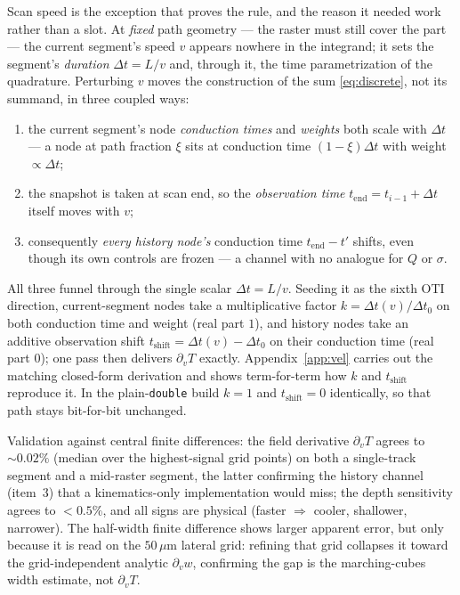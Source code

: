 \documentclass[11pt]{article}
\begin{document}
Scan speed is the exception that proves the rule, and the reason it needed
work rather than a slot. At \emph{fixed} path geometry --- the raster must
still cover the part --- the current segment's speed $v$ appears nowhere in
the integrand; it sets the segment's \emph{duration} $\Delta t = L/v$ and,
through it, the time parametrization of the quadrature. Perturbing $v$ moves
the construction of the sum \eqref{eq:discrete}, not its summand, in three
coupled ways:
\begin{enumerate}
  \item the current segment's node \emph{conduction times} and \emph{weights}
        both scale with $\Delta t$ --- a node at path fraction $\xi$ sits at
        conduction time $(1-\xi)\Delta t$ with weight $\propto \Delta t$;
  \item the snapshot is taken at scan end, so the \emph{observation time}
        $t_{\mathrm{end}} = t_{i-1} + \Delta t$ itself moves with $v$;
  \item consequently \emph{every history node's} conduction time
        $t_{\mathrm{end}} - t'$ shifts, even though its own controls are frozen
        --- a channel with no analogue for $Q$ or $\sigma$.
\end{enumerate}
All three funnel through the single scalar $\Delta t = L/v$. Seeding it as the
sixth OTI direction, current-segment nodes take a multiplicative factor
$k = \Delta t(v)/\Delta t_0$ on both conduction time and weight (real part
$1$), and history nodes take an additive observation shift
$t_{\mathrm{shift}} = \Delta t(v) - \Delta t_0$ on their conduction time (real
part $0$); one pass then delivers $\partial_v T$ exactly. Appendix~\ref{app:vel}
carries out the matching closed-form derivation and shows term-for-term how
$k$ and $t_{\mathrm{shift}}$ reproduce it. In the plain-\texttt{double} build
$k=1$ and $t_{\mathrm{shift}}=0$ identically, so that path stays bit-for-bit
unchanged.

Validation against central finite differences: the field derivative
$\partial_v T$ agrees to $\sim\!0.02\%$ (median over the highest-signal grid
points) on both a single-track segment and a mid-raster segment, the latter
confirming the history channel (item~3) that a kinematics-only implementation
would miss; the depth sensitivity agrees to $<0.5\%$, and all signs are
physical (faster $\Rightarrow$ cooler, shallower, narrower). The half-width
finite difference shows larger apparent error, but only because it is read on
the $50\,\mu$m lateral grid: refining that grid collapses it toward the
grid-independent analytic $\partial_v w$, confirming the gap is the
marching-cubes width estimate, not $\partial_v T$.
\end{document}
